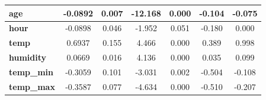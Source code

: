 \documentclass[12 pt]{scrartcl}
\numberwithin{equation}{section}
\begin{document}
\begin{table}[htb]
\begin{center}
\begin{tabular}{|l||c|c|c|c|cc|}
        \textbf{age}                              &      -0.0892  &        0.007     &   -12.168  &         0.000        &       -0.104    &       -0.075     \\ \hline
        \textbf{hour}                             &      -0.0898  &        0.046     &    -1.952  &         0.051        &       -0.180    &        0.000     \\ \hline
        \textbf{temp}                             &       0.6937  &        0.155     &     4.466  &         0.000        &        0.389    &        0.998     \\ \hline
        \textbf{humidity}                         &       0.0669  &        0.016     &     4.136  &         0.000        &        0.035    &        0.099     \\ \hline
        \textbf{temp\_min}                        &      -0.3059  &        0.101     &    -3.031  &         0.002        &       -0.504    &       -0.108     \\ \hline
        \textbf{temp\_max}                        &      -0.3587  &        0.077     &    -4.634  &         0.000        &       -0.510    &       -0.207     \\ \hline
        \hline
        
        \end{tabular}
        \label{table:coefficients-dia}
        \end{center}
    \end{table}
\end{document}
